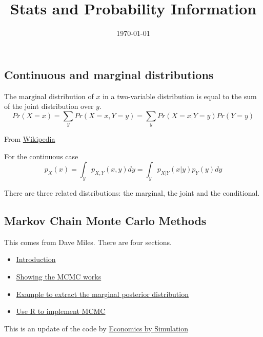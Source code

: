 \documentclass[12pt, a4paper, oneside]{article}\usepackage[]{graphicx}\usepackage[]{color}
\begin{document}
\title{Stats and Probability Information}
\date{\today}
\maketitle
\subsection*{Continuous and marginal distributions}

The marginal distribution of $x$ in a two-variable distribution is equal to the sum of the joint distribution over $y$. 
\begin{equation}
Pr(X = x) = \sum_y Pr(X = x, Y = y) = \sum_y Pr(X = x|Y = y)Pr(Y = y)
\end{equation}

From \href{http://en.wikipedia.org/wiki/Marginal_distribution}{Wikipedia}

For the continuous case
\begin{equation}
p_X(x) = \int_y p_{X,Y}(x,y)dy = \int_y p_{X|Y}(x|y)p_Y(y)dy
\end{equation}

There are three related distributions:  the marginal, the joint and the conditional. 

\subsection{Markov Chain Monte Carlo Methods}
This comes from Dave Miles.  There are four sections. 
\begin{itemize}
\item \href{http://davegiles.blogspot.ca/2014/03/mcmc-for-econometrics-students-i.html}{Introduction}
\item \href{http://davegiles.blogspot.ca/2014/03/mcmc-for-econometrics-students-ii_18.html}{Showing the MCMC works}
\item \href{http://davegiles.blogspot.ca/2014/03/mcmc-for-econometrics-students-iii.html}{Example to extract the marginal posterior distribution}
\item \href{http://davegiles.blogspot.com/2014/03/mcmc-for-econometrics-students-part-iv.html#more}{Use R to implement MCMC}
\end{itemize}

This is an update of the code by \href{http://www.econometricsbysimulation.com/2014/04/dave-giles-on-mcmc-for-econometrics.html}{Economics by Simulation}
\end{document}
